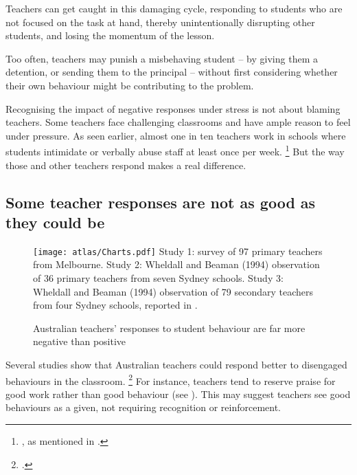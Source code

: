 \documentclass{grattan}
\begin{document}
Teachers can get caught in this damaging cycle, responding to students who are not focused on the task at hand, thereby unintentionally disrupting other students, and losing the momentum of the lesson.

Too often, teachers may punish a misbehaving student -- by giving them a detention, or sending them to the principal -- without first considering whether their own behaviour might be contributing to the problem.

Recognising the impact of negative responses under stress is not about blaming teachers. Some teachers face challenging classrooms and have ample reason to feel under pressure. As seen earlier, almost one in ten teachers work in schools where students intimidate or verbally abuse staff at least once per week.%
    \footnote{\textcite{Freeman2014AustralianTeachersLearning}, as mentioned in .}
But the way those and other teachers respond makes a real difference.
\subsection{Some teacher responses are not as good as they could be}\label{subsec:some-teacher-responses}

\begin{figure}
\caption{Australian teachers' responses to student behaviour are far more negative than positive}\label{fig:responses-more-negative}
\texttt{[image: atlas/Charts.pdf]}
%
{Study 1: \textcite{CluniesRoss-2008-Use-proactive-reactive-classroom-mgmt} survey of 97 primary teachers from Melbourne. Study 2: Wheldall and Beaman (1994) observation of 36 primary teachers from seven Sydney schools. Study 3: Wheldall and Beaman (1994) observation of 79 secondary teachers from four Sydney schools, reported in \textcite{BeamanWheldall-2000-Teachers-use-of-approval-disapproval}.}
\end{figure}


Several studies show that Australian teachers could respond better to disengaged behaviours in the classroom.%
    \footcites{Lewis2008StudentsReactionClassroom}{Montuoro2015StudentPerceptionsMisbehaviour}
For instance, teachers tend to reserve praise for good work rather than good behaviour (see ).
This may suggest teachers see good behaviours as a given, not requiring recognition or reinforcement.
\end{document}
